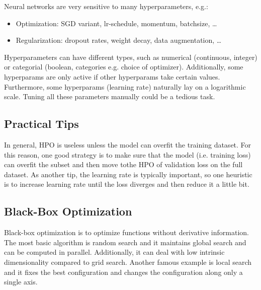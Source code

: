 Neural networks are very sensitive to many hyperparameters, e.g.:
\begin{itemize}
    \item Optimization: SGD variant, lr-schedule, momentum, batchsize, \dots
    \item Regularization: dropout rates, weight decay, data augmentation, \dots
\end{itemize}

Hyperparameters can have different types, such as numerical (continuous, integer) or categorial (boolean, categories e.g. choice of optimizer). Additionally, some hyperparams are only active if other hyperparams take certain values. Furthermore, some hyperparams (learning rate) naturally lay on a logarithmic scale. Tuning all these parameters manually could be a tedious task.

\subsection{Practical Tips}
In general, HPO is useless unless the model can overfit the training dataset. For this reason, one good strategy is to make sure that the model (i.e. training loss) can overfit the subset and then move tothe HPO of validation loss on the full dataset. As another tip, the learning rate is typically important, so one heuristic is to increase learning rate until the loss diverges and then reduce it a little bit.

\subsection{Black-Box Optimization}
Black-box optimization is to optimize functions without derivative information. The most basic algorithm is random search and it maintains global search and can be computed in parallel. Additionally, it can deal with low intrinsic dimensionality compared to grid search. Another famous example is local search and it fixes the best configuration and changes the configuration along only a single axis.

